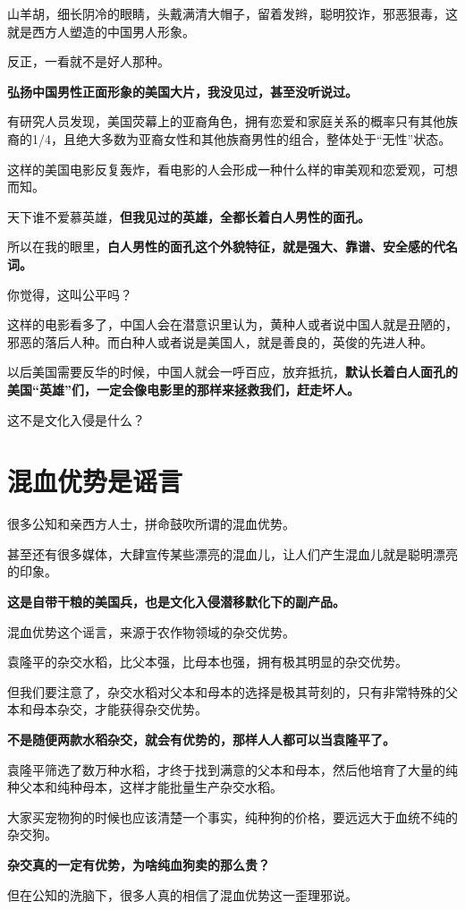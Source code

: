 \documentclass[UTF8, 11pt, oneside]{ctexart}
\newcommand{\zd}[1]{\textbf{\textcolor[RGB]{123,12,0}{#1}}} %
\newcommand{\biaoti}[1]{%
    \section*{#1}
}
\begin{document}
山羊胡，细长阴冷的眼睛，头戴满清大帽子，留着发辫，聪明狡诈，邪恶狠毒，这就是西方人塑造的中国男人形象。

反正，一看就不是好人那种。

\zd{弘扬中国男性正面形象的美国大片，我没见过，甚至没听说过。}

有研究人员发现，美国荧幕上的亚裔角色，拥有恋爱和家庭关系的概率只有其他族裔的1/4，且绝大多数为亚裔女性和其他族裔男性的组合，整体处于“无性”状态。

这样的美国电影反复轰炸，看电影的人会形成一种什么样的审美观和恋爱观，可想而知。

天下谁不爱慕英雄，\zd{但我见过的英雄，全都长着白人男性的面孔。}

所以在我的眼里，\zd{白人男性的面孔这个外貌特征，就是强大、靠谱、安全感的代名词。}

你觉得，这叫公平吗？

这样的电影看多了，中国人会在潜意识里认为，黄种人或者说中国人就是丑陋的，邪恶的落后人种。而白种人或者说是美国人，就是善良的，英俊的先进人种。

以后美国需要反华的时候，中国人就会一呼百应，放弃抵抗，\zd{默认长着白人面孔的美国“英雄”们，一定会像电影里的那样来拯救我们，赶走坏人。}

这不是文化入侵是什么？


\biaoti{混血优势是谣言}

很多公知和亲西方人士，拼命鼓吹所谓的混血优势。

甚至还有很多媒体，大肆宣传某些漂亮的混血儿，让人们产生混血儿就是聪明漂亮的印象。

\zd{这是自带干粮的美国兵，也是文化入侵潜移默化下的副产品。}

混血优势这个谣言，来源于农作物领域的杂交优势。

袁隆平的杂交水稻，比父本强，比母本也强，拥有极其明显的杂交优势。

但我们要注意了，杂交水稻对父本和母本的选择是极其苛刻的，只有非常特殊的父本和母本杂交，才能获得杂交优势。

\zd{不是随便两款水稻杂交，就会有优势的，那样人人都可以当袁隆平了。}

袁隆平筛选了数万种水稻，才终于找到满意的父本和母本，然后他培育了大量的纯种父本和纯种母本，这样才能批量生产杂交水稻。

大家买宠物狗的时候也应该清楚一个事实，纯种狗的价格，要远远大于血统不纯的杂交狗。

\zd{杂交真的一定有优势，为啥纯血狗卖的那么贵？}

但在公知的洗脑下，很多人真的相信了混血优势这一歪理邪说。
\end{document}
